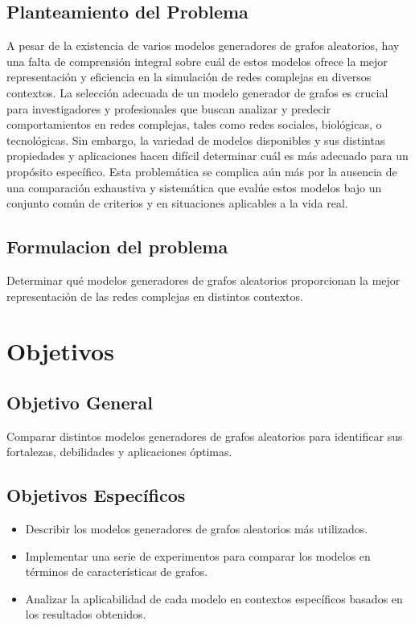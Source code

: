 \documentclass[12pt]{book}
\begin{document}
\subsection{Planteamiento del Problema}
A pesar de la existencia de varios modelos generadores de grafos aleatorios, hay una falta de comprensión integral sobre cuál de estos modelos ofrece la mejor representación y eficiencia en la simulación de redes complejas en diversos contextos. La selección adecuada de un modelo generador de grafos es crucial para investigadores y profesionales que buscan analizar y predecir comportamientos en redes complejas, tales como redes sociales, biológicas, o tecnológicas. Sin embargo, la variedad de modelos disponibles y sus distintas propiedades y aplicaciones hacen difícil determinar cuál es más adecuado para un propósito específico. Esta problemática se complica aún más por la ausencia de una comparación exhaustiva y sistemática que evalúe estos modelos bajo un conjunto común de criterios y en situaciones aplicables a la vida real.

\subsection{Formulacion del problema}
Determinar qué modelos generadores de grafos aleatorios proporcionan la mejor representación de las redes complejas en distintos contextos.


\section{Objetivos}
\subsection{Objetivo General}
Comparar distintos modelos generadores de grafos aleatorios para identificar sus fortalezas, debilidades y aplicaciones óptimas.
\subsection{Objetivos Específicos}
\begin{itemize}
    \item Describir los modelos generadores de grafos aleatorios más utilizados.
    \item Implementar una serie de experimentos para comparar los modelos en términos de características de grafos.
    \item Analizar la aplicabilidad de cada modelo en contextos específicos basados en los resultados obtenidos.
\end{itemize}
\end{document}
